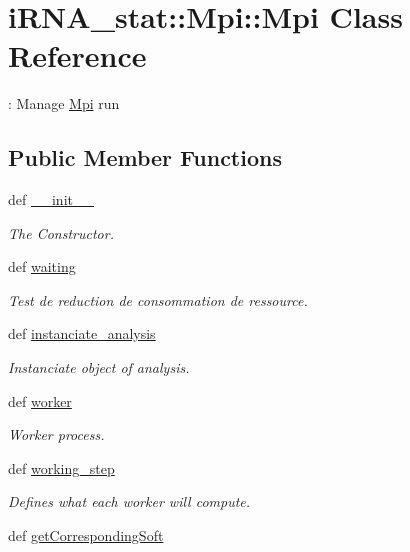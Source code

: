 \hypertarget{classiRNA__stat_1_1Mpi_1_1Mpi}{
\section{i\-R\-N\-A\-\_\-stat\-:\-:\-Mpi\-:\-:\-Mpi \-Class \-Reference}
\label{classiRNA__stat_1_1Mpi_1_1Mpi}
}


\-: \-Manage \hyperlink{classiRNA__stat_1_1Mpi_1_1Mpi}{\-Mpi} run  


\subsection*{\-Public \-Member \-Functions}
\begin{DoxyCompactItemize}
\item 
def \hyperlink{classiRNA__stat_1_1Mpi_1_1Mpi_af89b752b0452697c2535286295b9ae85}{\-\_\-\-\_\-init\-\_\-\-\_\-}
\begin{DoxyCompactList}\small\item\em \-The \-Constructor. \end{DoxyCompactList}\item 
\hypertarget{classiRNA__stat_1_1Mpi_1_1Mpi_aef02a58ffc6e26983e21b9675ca226b0}{
def \hyperlink{classiRNA__stat_1_1Mpi_1_1Mpi_aef02a58ffc6e26983e21b9675ca226b0}{waiting}}
\label{classiRNA__stat_1_1Mpi_1_1Mpi_aef02a58ffc6e26983e21b9675ca226b0}

\begin{DoxyCompactList}\small\item\em \-Test de reduction de consommation de ressource. \end{DoxyCompactList}\item 
def \hyperlink{classiRNA__stat_1_1Mpi_1_1Mpi_a1071f9d866a76bc5285bec0f13f2d351}{instanciate\-\_\-analysis}
\begin{DoxyCompactList}\small\item\em \-Instanciate object of analysis. \end{DoxyCompactList}\item 
def \hyperlink{classiRNA__stat_1_1Mpi_1_1Mpi_adf013ffb7dfb10fb005780aafa80de4a}{worker}
\begin{DoxyCompactList}\small\item\em \-Worker process. \end{DoxyCompactList}\item 
def \hyperlink{classiRNA__stat_1_1Mpi_1_1Mpi_a289280f94a7380e2db08a349f08fda94}{working\-\_\-step}
\begin{DoxyCompactList}\small\item\em \-Defines what each worker will compute. \end{DoxyCompactList}\item 
\hypertarget{classiRNA__stat_1_1Mpi_1_1Mpi_a6a9c7dcfae5e31ec58443cdfbc74e530}{
def \hyperlink{classiRNA__stat_1_1Mpi_1_1Mpi_a6a9c7dcfae5e31ec58443cdfbc74e530}{get\-Corresponding\-Soft}}
\label{classiRNA__stat_1_1Mpi_1_1Mpi_a6a9c7dcfae5e31ec58443cdfbc74e530}


\end{DoxyCompactItemize}
